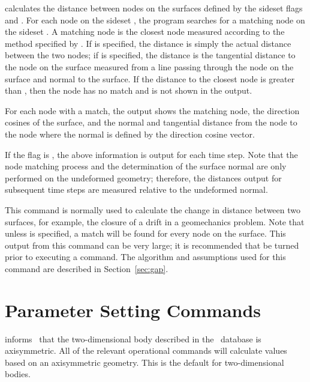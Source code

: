  {
 calculates the distance between nodes on the surfaces defined
by the sideset flags  and .  For each
node on the sideset , the program searches for a
matching node on the sideset .  A matching node is
the closest node measured according to the method specified by
.  If  is specified, the
distance is simply the actual distance between the two nodes; if
 is specified, the distance is the tangential distance to
the node on the  surface measured from a line passing
through the node on the  surface and normal to the
surface.  If the distance to the closest  node is
greater than , then the  node has no
match and is not shown in the output.

For each   node with a match, the output shows the
matching   node, the direction cosines of the surface,
and the normal and tangential distance from the   node
to the   node where the normal is defined by the
direction cosine vector.

If the  flag is , the above information is output
for each time step.  Note that the node matching process and the
determination of the surface normal are only performed on the undeformed
geometry; therefore, the distances output for subsequent time steps are
measured relative to the undeformed normal.

This command is normally used to calculate the change in distance
between two surfaces, for example, the closure of a drift in a
geomechanics problem.  Note that unless  is specified,
a match will be found for every node on the  surface.
This output from this command can be very large; it is recommended that
 be turned  prior to executing a  command.
The algorithm and assumptions used for this command are described in
Section~\ref{sec:gap}.
}

\section{Parameter Setting Commands}\label{sec:param}

 {
 informs \numbers\ that the two-dimensional body
described in the \EXO\ database is axisymmetric.  All of the relevant
operational commands will calculate values based on an axisymmetric
geometry.  This is the default for two-dimensional bodies.
}

